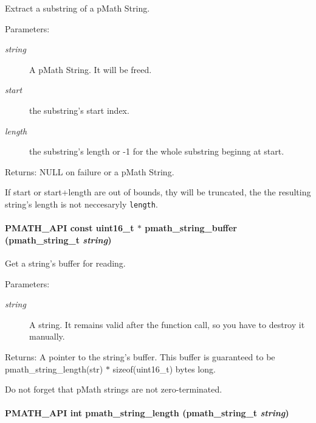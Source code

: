 Extract a substring of a pMath String. 

\begin{Desc}
\item[Parameters:]
\begin{description}
\item[{\em string}]A pMath String. It will be freed. \item[{\em start}]the substring's start index. \item[{\em length}]the substring's length or -1 for the whole substring beginng at start. \end{description}
\end{Desc}
\begin{Desc}
\item[Returns:]NULL on failure or a pMath String.\end{Desc}
If start or start+length are out of bounds, thy will be truncated, the the resulting string's length is not neccesaryly {\tt length}. \hypertarget{group__strings_g381c6abdb25ce421c93c72aa51f33c29}{
\paragraph[{pmath\_\-string\_\-buffer}]{\setlength{\rightskip}{0pt plus 5cm}PMATH\_\-API const uint16\_\-t $\ast$ pmath\_\-string\_\-buffer ({\bf pmath\_\-string\_\-t} {\em string})}\hfill}
\label{group__strings_g381c6abdb25ce421c93c72aa51f33c29}


Get a string's buffer for reading. 

\begin{Desc}
\item[Parameters:]
\begin{description}
\item[{\em string}]A string. It remains valid after the function call, so you have to destroy it manually. \end{description}
\end{Desc}
\begin{Desc}
\item[Returns:]A pointer to the string's buffer. This buffer is guaranteed to be pmath\_\-string\_\-length(str) $\ast$ sizeof(uint16\_\-t) bytes long.\end{Desc}
Do not forget that pMath strings are not zero-terminated. \hypertarget{group__strings_g4f5ac7eaecd0c7e9916794145938874d}{
\paragraph[{pmath\_\-string\_\-length}]{\setlength{\rightskip}{0pt plus 5cm}PMATH\_\-API int pmath\_\-string\_\-length ({\bf pmath\_\-string\_\-t} {\em string})}\hfill}
\label{group__strings_g4f5ac7eaecd0c7e9916794145938874d}


